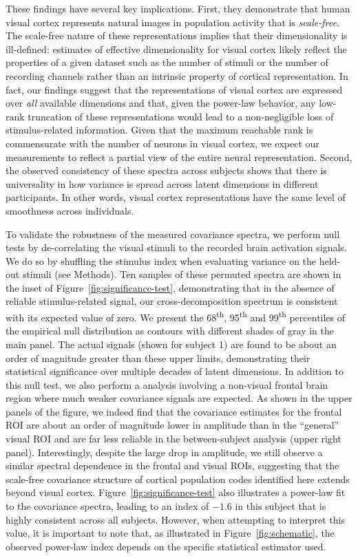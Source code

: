 \documentclass[10pt]{article}
\begin{document}
These findings have several key implications. First, they demonstrate that human visual cortex represents natural images in population activity that is \emph{scale-free}. The scale-free nature of these representations implies that their dimensionality is ill-defined: estimates of effective dimensionality for visual cortex likely reflect the properties of a given dataset such as the number of stimuli or the number of recording channels rather than an intrinsic property of cortical representation. In fact, our findings suggest that the representations of visual cortex are expressed over \emph{all} available dimensions and that, given the power-law behavior, any low-rank truncation of these representations would lead to a non-negligible loss of stimulus-related information. Given that the maximum reachable rank is commensurate with the number of neurons in visual cortex, we expect our measurements to reflect a partial view of the entire neural representation. Second, the observed consistency of these spectra across subjects shows that there is universality in how variance is spread across latent dimensions in different participants. In other words, visual cortex representations have the same level of smoothness across individuals.

To validate the robustness of the measured covariance spectra, we perform null tests by de-correlating the visual stimuli to the recorded brain activation signals. We do so by shuffling the stimulus index when evaluating variance on the held-out stimuli (see Methods). Ten samples of these permuted spectra are shown in the inset of Figure~\ref{fig:significance-test}, demonstrating that in the absence of reliable stimulus-related signal, our cross-decomposition spectrum is consistent with its expected value of zero. We present the 68\textsuperscript{th}, 95\textsuperscript{th} and 99\textsuperscript{th} percentiles of the empirical null distribution as contours with different shades of gray in the main panel. The actual signals (shown for subject 1) are found to be about an order of magnitude greater than these upper limits, demonstrating their statistical significance over multiple decades of latent dimensions. In addition to this null test, we also perform a analysis involving a non-visual frontal brain region where much weaker covariance signals are expected. As shown in the upper panels of the figure, we indeed find that the covariance estimates for the frontal ROI are about an order of magnitude lower in amplitude than in the ``general'' visual ROI and are far less reliable in the between-subject analysis (upper right panel). Interestingly, despite the large drop in amplitude, we still observe a similar spectral dependence in the frontal and visual ROIs, suggesting that the scale-free covariance structure of cortical population codes identified here extends beyond visual cortex. Figure~\ref{fig:significance-test} also illustrates a power-law fit to the covariance spectra, leading to an index of \(-1.6\) in this subject that is highly consistent across all subjects. However, when attempting to interpret this value, it is important to note that, as illustrated in Figure~\ref{fig:schematic}, the observed power-law index depends on the specific statistical estimator used.
\end{document}
